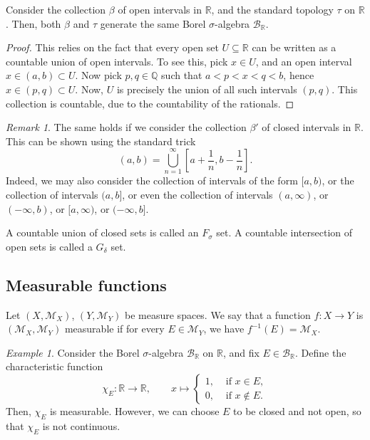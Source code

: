 \documentclass[11pt]{article}
\newcommand{\R}{\mathbb{R}}
\newcommand{\Q}{\mathbb{Q}}
\newcommand{\M}{\mathcal{M}}
\theoremstyle{definition}
\theoremstyle{remark}
\newtheorem*{remark}{Remark}
\newtheorem*{example}{Example}
\numberwithin{equation}{section}
\begin{document}
    \begin{theorem}
        Consider the collection $\beta$ of open intervals in $\R$, and the standard
        topology $\tau$ on $\R$. Then, both $\beta$ and $\tau$ generate the same
        Borel $\sigma$-algebra $\mathcal{B}_\R$.
    \end{theorem}
    \begin{proof}
        This relies on the fact that every open set $U \subseteq \R$ can be written
        as a countable union of open intervals. To see this, pick $x \in U$, and an
        open interval $x \in (a, b) \subset U$. Now pick $p, q \in \Q$ such that $a <
        p < x < q < b$, hence $x \in (p, q) \subset U$. Now, $U$ is precisely the
        union of all such intervals $(p, q)$. This collection is countable, due to
        the countability of the rationals.
    \end{proof}
    \begin{remark}
        The same holds if we consider the collection $\beta'$ of closed intervals in
        $\R$. This can be shown using the standard trick \[
            (a, b) = \bigcup_{n = 1}^\infty \left[a + \frac{1}{n}, b -
            \frac{1}{n}\right].
        \] Indeed, we may also consider the collection of intervals of the form $[a,
        b)$, or the collection of intervals $(a, b]$, or even the collection of
        intervals $(a, \infty)$, or $(-\infty, b)$, or $[a, \infty)$, or $(-\infty,
        b]$.
    \end{remark}

    \begin{definition}
        A countable union of closed sets is called an $F_\sigma$ set. A countable
        intersection of open sets is called a $G_\delta$ set.
    \end{definition}

    
    \subsection{Measurable functions}

    \begin{definition}
        Let $(X, \M_X)$, $(Y, \M_Y)$ be measure spaces. We say that a function
        $f\colon X \to Y$ is $(\M_X, \M_Y)$ measurable if for every $E \in \M_Y$, we
        have $f^{-1}(E) = \M_X$.
    \end{definition}
    \begin{example}
        Consider the Borel $\sigma$-algebra $\mathcal{B}_\R$ on $\R$, and fix $E \in
        \mathcal{B}_\R$. Define the characteristic function \[
            \chi_E\colon \R \to \R, \qquad x \mapsto \begin{cases}
                1, &\text{ if } x \in E, \\
                0, &\text{ if } x \notin E.
            \end{cases}
        \] Then, $\chi_E$ is measurable. However, we can choose $E$ to be closed and
        not open, so that $\chi_E$ is not continuous.
    \end{example}
\end{document}
